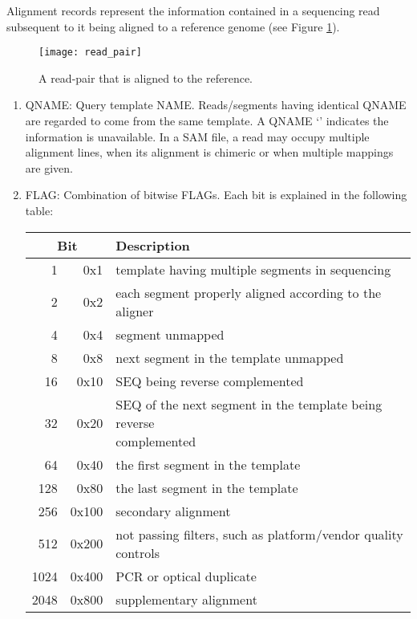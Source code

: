 Alignment records represent the information contained in a sequencing read subsequent to it being aligned to a reference genome (see Figure \ref{fig:bg_read_pair}).

\begin{figure}[H]
\texttt{[image: read\_pair]}
\centering
\caption {A read-pair that is aligned to the reference.}
\label{fig:bg_read_pair}
\end{figure}

\begin{enumerate}
    \item {\sf QNAME}: Query template NAME. Reads/segments having identical {\sf QNAME} are regarded to come from the same template. A {\sf QNAME} `{\tt *}' indicates the information is unavailable.  In a SAM file, a read may occupy
        multiple alignment lines, when its alignment is chimeric or when multiple mappings are given.
    \item {\sf FLAG}: Combination of bitwise FLAGs. Each bit is explained in the following table:
      \begin{center}\small
      \begin{tabular}{rrl}
      \hline
      \multicolumn{2}{c}{Bit} & Description\\
      \hline
        1 &    0x1 & template having multiple segments in sequencing \\
        2 &    0x2 & each segment properly aligned according to the aligner \\
        4 &    0x4 & segment unmapped \\
        8 &    0x8 & next segment in the template unmapped \\
       16 &   0x10 & {\sf SEQ} being reverse complemented \\
       32 &   0x20 & \pbox{5cm}{{\sf SEQ} of the next segment in the template being reverse\\ complemented} \\
       64 &   0x40 & the first segment in the template \\
      128 &   0x80 & the last segment in the template \\
      256 &  0x100 & secondary alignment \\
      512 &  0x200 & not passing filters, such as platform/vendor quality controls \\
     1024 &  0x400 & PCR or optical duplicate \\
     2048 &  0x800 & supplementary alignment \\
      \hline

\end{tabular}
\end{center}
\end{enumerate}
